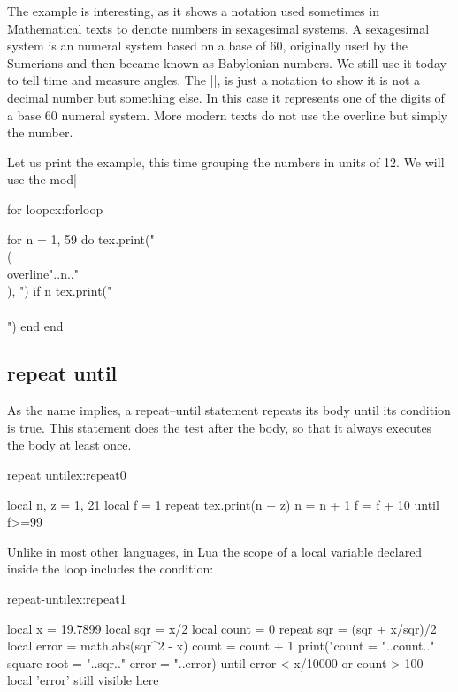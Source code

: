 The example is interesting, as it shows a notation used sometimes in Mathematical texts to denote numbers in sexagesimal systems. A sexagesimal system is an numeral system based on a base of 60, originally used by the Sumerians and then became known as Babylonian numbers. We still use it today to tell time and measure angles. The |\overline|, is just a notation to show it is not a decimal number but something else. In this case it represents one of the digits of a base 60 numeral system. More modern texts do not use the overline but simply the number. 

Let us print the example, this time grouping the numbers in units of 12. We will use the mod|%

\begin{texexample}{for loop}{ex:forloop}
\begin{luacode}
for n = 1, 59 do
   tex.print("\\(\\overline{"..n.."}\\), ")
   if n%
      tex.print("\\\\")
   end 
end
\end{luacode}
\end{texexample}


\subsection{repeat until}

As the name implies, a repeat–until statement repeats its body until its condition
is true. This statement does the test after the body, so that it always
executes the body at least once.

\let\exec\directlua

\begin{texexample}{repeat until}{ex:repeat0}
\begin{luacode}
local  n, z = 1, 21
local  f = 1
  repeat
    tex.print(n + z)
    n = n + 1
    f = f + 10
  until f>=99
\end{luacode}
\end{texexample}

Unlike in most other languages, in Lua the scope of a local variable declared
inside the loop includes the condition:

\begin{texexample}{repeat-until}{ex:repeat1}
\begin{luacode}
local x = 19.7899
local sqr = x/2
local count = 0
repeat
   sqr = (sqr + x/sqr)/2
   local error = math.abs(sqr^2 - x)
   count = count + 1
   print("count = "..count.." square root = "..sqr.." error = "..error)
until error < x/10000 or count > 100-- local 'error' still visible here
\end{luacode}
\end{texexample}


